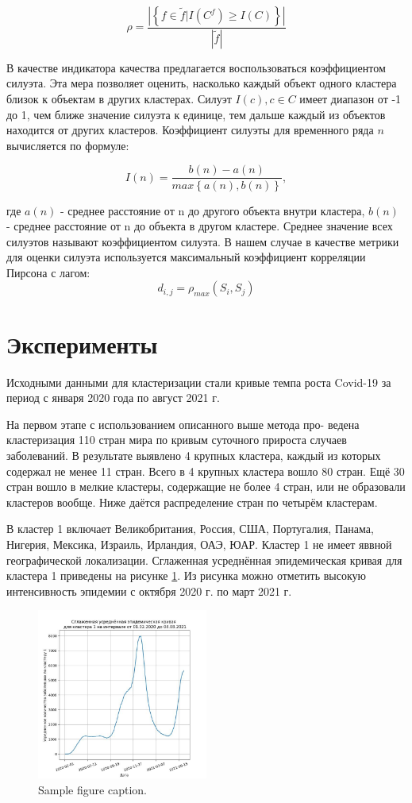 \documentclass{article}
\begin{document}
$$\rho = \frac{|\left\{ f \in \widetilde {f}| I(C^f) \geq  I(C)\right\}|}{|\widetilde {f}|}$$

В качестве индикатора качества предлагается воспользоваться коэффициентом силуэта. Эта мера позволяет оценить, насколько каждый объект одного кластера близок к объектам в других кластерах. Силуэт $I(c), c\in C $ имеет диапазон от -1 до 1, чем ближе значение силуэта к единице, тем дальше каждый из объектов находится от других кластеров. Коэффициент силуэты для временного ряда $n$ вычисляется по формуле:

$$I(n) = \frac{b(n) - a(n)}{max\left\{a(n), b(n)\right\}},$$

где $a(n)$ - среднее расстояние от n до другого объекта внутри кластера, $b(n)$ - среднее расстояние от n до объекта в другом кластере. Среднее значение всех силуэтов называют коэффициентом силуэта.
В нашем случае в качестве метрики для оценки силуэта используется максимальный коэффициент корреляции Пирсона с лагом:
 $$d_{i,j} = \rho_{max}(S_i, S_j)$$

\section{Эксперименты}

Исходными данными для кластеризации стали кривые темпа роста Covid-19 за период с января 2020 года по август 2021 г.

На первом этапе с использованием описанного выше метода про-
ведена кластеризация 110 стран мира по кривым суточного прироста случаев заболеваний. В результате выявлено 4 крупных кластера, каждый из которых содержал не менее 11 стран. Всего в 4 крупных кластера вошло 80 стран. Ещё 30 стран вошло в мелкие кластеры, содержащие не более 4 стран, или не образовали кластеров вообще. Ниже даётся распределение стран по четырём кластерам.

В кластер 1 включает Великобритания, Россия, США, Португалия, Панама, Нигерия, Мексика, Израиль, Ирландия, ОАЭ, ЮАР. Кластер 1 не имеет яввной географической локализации. Сглаженная усреднённая эпидемическая кривая для кластера 1 приведены на рисунке \ref{fig:fig1}. Из рисунка можно отметить высокую интенсивность эпидемии с октября 2020 г. по март 2021 г.


\begin{figure}
	\centering
	\includegraphics[width=0.5\textwidth]{../figures/clasters1.jpg}
	\caption{Sample figure caption.}
	\label{fig:fig1}
\end{figure}
\end{document}
